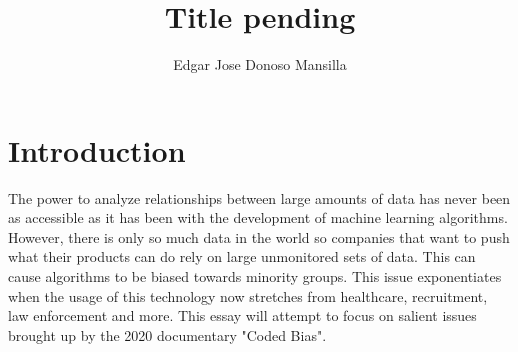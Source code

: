 \documentclass[sigconf, 12pt]{acmart}
\title[CS205 Paper 2]{Title pending}
\author{Edgar Jose Donoso Mansilla}
\affiliation{
	\institution{DigiPen Institute of Technology}
	\country{USA}
}
\begin{document}
\maketitle

\section{Introduction}
The power to analyze relationships between large amounts of data has never been as accessible as it has been with the development of machine learning algorithms. However, there is only so much data in the world so companies that want to push what their products can do rely on large unmonitored sets of data. This can cause algorithms to be biased towards minority groups. This issue exponentiates when the usage of this technology now stretches from healthcare, recruitment, law enforcement and more. This essay will attempt to focus on salient issues brought up by the 2020 documentary "Coded Bias".






\onecolumn



\end{document}
